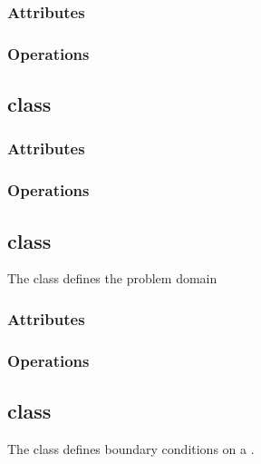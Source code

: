 \documentclass{article}
\begin{document}
\subsubsection{Attributes}

\subsubsection{Operations}

\subsection{ class}


\subsubsection{Attributes}

\subsubsection{Operations}

\subsection{ class}

The  class defines the problem domain


\subsubsection{Attributes}

\subsubsection{Operations}

\subsection{ class}

The  class defines boundary conditions on a .
\end{document}
